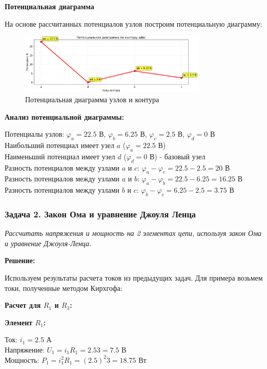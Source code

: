 \textbf{Потенциальная диаграмма}

На основе рассчитанных потенциалов узлов построим потенциальную диаграмму:

\begin{figure}[H]
\centering
\includegraphics[width=0.8\textwidth]{images/exanple_potential_diagram.png}
\caption{Потенциальная диаграмма узлов и контура}
\label{fig:potential_diagram}
\end{figure}

\textbf{Анализ потенциальной диаграммы:}
\begin{flushleft}
Потенциалы узлов: $\varphi_a = 22.5$ В, $\varphi_b = 6.25$ В, $\varphi_c = 2.5$ В, $\varphi_d = 0$ В \\
Наибольший потенциал имеет узел $a$ ($\varphi_a = 22.5$ В) \\
Наименьший потенциал имеет узел $d$ ($\varphi_d = 0$ В) - базовый узел \\
Разность потенциалов между узлами $a$ и $c$: $\varphi_a - \varphi_c = 22.5 - 2.5 = 20$ В \\
Разность потенциалов между узлами $a$ и $b$: $\varphi_a - \varphi_b = 22.5 - 6.25 = 16.25$ В \\
Разность потенциалов между узлами $b$ и $c$: $\varphi_b - \varphi_c = 6.25 - 2.5 = 3.75$ В
\end{flushleft}


\subsubsection{Задача 2. Закон Ома и уравнение Джоуля Ленца}
\textit{Рассчитать напряжения и мощность на 2 элементах цепи, используя закон Ома и уравнение Джоуля-Ленца.}

\textbf{Решение:}

Используем результаты расчета токов из предыдущих задач. Для примера возьмем токи, полученные методом Кирхгофа:

\textbf{Расчет для $R_1$ и $R_3$:}

\textbf{Элемент $R_1$:}
\begin{flushleft}
Ток: $i_1 = 2.5$ А \\
Напряжение: $U_1 = i_1R_1 = 2.5 3 = 7.5$ В \\
Мощность: $P_1 = i_1^2R_1 = (2.5)^2  3 = 18.75$ Вт
\end{flushleft}

